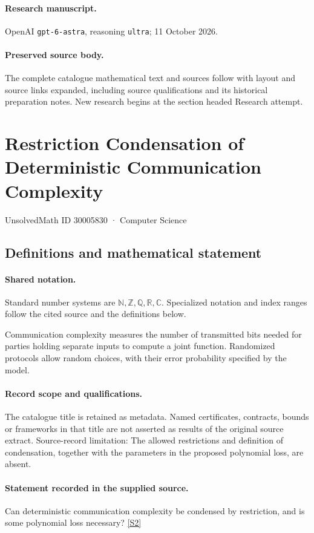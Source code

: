 \documentclass[11pt]{article}
\begin{document}
\paragraph{Research manuscript.} OpenAI \texttt{gpt-6-astra}, reasoning \texttt{ultra}; 11 October 2026.
\paragraph{Preserved source body.} The complete catalogue mathematical text and sources follow with layout and source links expanded, including source qualifications and its historical preparation notes. New research begins at the section headed Research attempt.

\section{Restriction Condensation of Deterministic Communication Complexity}\label{30005830}
{\small UnsolvedMath ID 30005830 · Computer Science}
\subsection{Definitions and mathematical statement}

\paragraph{Shared notation.}Standard number systems are $\mathbb N,\mathbb Z,\mathbb Q,\mathbb R,\mathbb C$. Specialized notation and index ranges follow the cited source and the definitions below.


Communication complexity measures the number of transmitted bits needed for parties holding separate inputs to compute a joint function. Randomized protocols allow random choices, with their error probability specified by the model.
\paragraph{Record scope and qualifications.}
The catalogue title is retained as metadata. Named certificates, contracts, bounds or frameworks in that title are not asserted as results of the original source extract.
Source-record limitation: The allowed restrictions and definition of condensation, together with the parameters in the proposed polynomial loss, are absent.
\paragraph{Statement recorded in the supplied source.}
Can deterministic communication complexity be condensed by restriction, and is some polynomial loss necessary? \href{https://doi.org/10.4171/owr/2024/15}{[S2]}
\end{document}
